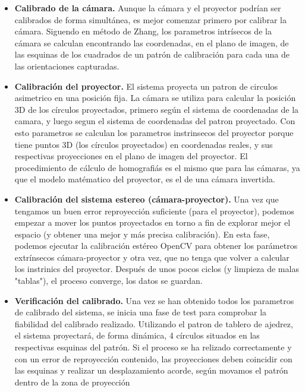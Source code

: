 \begin{itemize}
\item\textbf{Calibrado de la cámara. } Aunque la cámara y el proyector podrían ser calibrados de forma simultánea, es mejor comenzar primero por calibrar la cámara. Siguendo en método de Zhang, los parametros intrísecos de la cámara se calculan encontrando las coordenadas, en el plano de imagen, de las esquinas de los cuadrados de un patrón de calibración para cada una de las orientaciones capturadas.

\item\textbf{Calibración del proyector. } El sistema proyecta un patron de circulos asimetrico en una posición fija. La cámara se utiliza para calcular la posición 3D de los círculos proyectados, primero según el sistema de coordenadas de la camara, y luego segun el sistema de coordenadas del patron proyectado. Con esto parametros se calculan los parametros instrinsecos del proyector porque tiene puntos 3D (los círculos proyectados) en coordenadas reales, y sus respectivas proyecciones en el plano de imagen del proyector. El procedimiento de cálculo de homografiás es el mismo que para las cámaras, ya que el modelo matématico del proyector, es el de una cámara invertida. 

\item\textbf{Calibración del sistema estereo (cámara-proyector). } Una vez que tengamos un buen error reproyección suficiente (para el proyector), podemos empezar a mover los puntos proyectados en torno a fin de explorar mejor el espacio (y obtener una mejor y más precisa calibración). En esta fase, podemos ejecutar la calibración estéreo OpenCV para obtener los parámetros extrínsecos cámara-proyector y otra vez, que no tenga que volver a calcular los instrinics del proyector. Después de unos pocos ciclos (y limpieza de malas "tablas"), el proceso converge, los datos se guardan.

\item\textbf{Verificación del calibrado. } Una vez se han obtenido todos los parametros de calibrado del sistema, se inicia una fase de test para comprobar la fiabilidad del calibrado realizado. Utilizando el patron de tablero de ajedrez, el sistema proyectará, de forma dinámica, 4 círculos situados en las respectivas esquinas del patrón. Si el proceso se ha relizado correctamente y con un error de reproyección contenido, las proyecciones deben coincidir con las esquinas y realizar un desplazamiento acorde, según movamos el patrón dentro de la zona de proyección 
\end{itemize}

